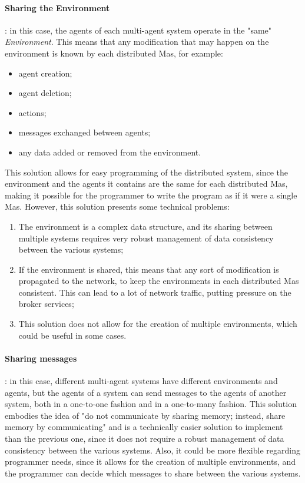 \paragraph{Sharing the Environment}: in this case, the agents of each multi-agent system operate in the "same" \textit{Environment}.
This means that any modification that may happen on the environment is known by each distributed Mas, for example:
\begin{itemize}
    \item agent creation;
    \item agent deletion;
    \item actions;
    \item messages exchanged between agents;
    \item any data added or removed from the environment.
\end{itemize}

This solution allows for easy programming of the distributed system, since the environment and the agents it contains are the same for each distributed Mas, making it possible for the programmer to write the program as if it were a single Mas.
However, this solution presents some technical problems:
\begin{enumerate}
    \item The environment is a complex data structure, and its sharing between multiple systems requires very robust management of data consistency between the various systems;
    \item If the environment is shared, this means that any sort of modification is propagated to the network, to keep the environments in each distributed Mas consistent. This
          can lead to a lot of network traffic, putting pressure on the broker services;
    \item This solution does not allow for the creation of multiple environments, which could be useful in some cases.
\end{enumerate}

\paragraph{Sharing messages}: in this case, different multi-agent systems have different environments and agents, but the agents of a system can send messages to the agents of another system, both in a one-to-one fashion and in a one-to-many fashion.
This solution embodies the idea of "do not communicate by sharing memory; instead, share memory by communicating" and is a technically easier solution to implement than the previous one, since it does not require a robust management of data consistency between the various systems.
Also, it could be more flexible regarding programmer needs, since it allows for the creation of multiple environments, and the programmer can decide which messages to share between the various systems.

